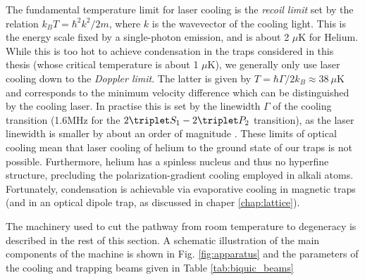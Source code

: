 
	The fundamental temperature limit for laser cooling is the \emph{recoil limit} set by the relation $k_B T = \hbar^2k^2/2m$, where $k$ is the wavevector of the cooling light.
	This is the energy scale fixed by a single-photon emission, and is about 2 $\mu$K for Helium.
	While this is too hot to achieve condensation in the traps considered in this thesis (whose critical temperature is about 1 $\mu$K), we generally only use laser cooling down to the \emph{Doppler limit}.
	The latter is given by $T = \hbar\Gamma/2 k_B\approx 38~\mu$K and corresponds to the minimum velocity difference which can be distinguished by the cooling laser.
	In practise this is set by the linewidth $\Gamma$ of the cooling transition (1.6MHz for the $2\triplet S_1 - 2\triplet P_2$ transition), as the laser linewidth is smaller by about an order of magnitude \cite{Shin16}.
	These limits of optical cooling mean that laser cooling of helium to the ground state of our traps is not possible.
	Furthermore, helium has a spinless nucleus and thus no hyperfine structure, precluding the polarization-gradient cooling employed in alkali atoms.
	Fortunately, condensation is achievable via evaporative cooling in magnetic traps (and in an optical dipole trap, as discussed in chaper \ref{chap:lattice}).
	
	The machinery used to cut the pathway from room temperature to degeneracy is described in the rest of this section. A schematic illustration of the main components of the machine is shown in Fig. \ref{fig:apparatus} and the parameters of the cooling and trapping beams given in Table \ref{tab:biquic_beams}




